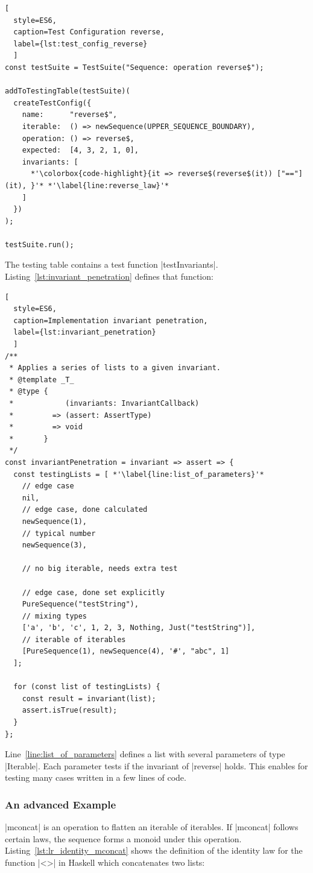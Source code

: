 \begin{lstlisting}[
  style=ES6, 
  caption=Test Configuration reverse,
  label={lst:test_config_reverse}
  ]
const testSuite = TestSuite("Sequence: operation reverse$");

addToTestingTable(testSuite)(
  createTestConfig({
    name:      "reverse$",
    iterable:  () => newSequence(UPPER_SEQUENCE_BOUNDARY),
    operation: () => reverse$,
    expected:  [4, 3, 2, 1, 0],
    invariants: [
      *'\colorbox{code-highlight}{it => reverse$(reverse$(it)) ["=="] (it), }'* *'\label{line:reverse_law}'*
    ]
  })
);

testSuite.run();
\end{lstlisting}
The testing table contains a test function |testInvariants|.
Listing~\ref{lst:invariant_penetration} defines that function:

\begin{lstlisting}[
  style=ES6, 
  caption=Implementation invariant penetration,
  label={lst:invariant_penetration}
  ]
/**
 * Applies a series of lists to a given invariant.
 * @template _T_
 * @type {
 *            (invariants: InvariantCallback)
 *         => (assert: AssertType)
 *         => void
 *       }
 */
const invariantPenetration = invariant => assert => {
  const testingLists = [ *'\label{line:list_of_parameters}'*
    // edge case
    nil,                                                   
    // edge case, done calculated
    newSequence(1),                                        
    // typical number
    newSequence(3),                                        

    // no big iterable, needs extra test

    // edge case, done set explicitly
    PureSequence("testString"),                            
    // mixing types
    ['a', 'b', 'c', 1, 2, 3, Nothing, Just("testString")], 
    // iterable of iterables
    [PureSequence(1), newSequence(4), '#', "abc", 1]       
  ];

  for (const list of testingLists) {
    const result = invariant(list);
    assert.isTrue(result);
  }
};
\end{lstlisting}

Line~\ref{line:list_of_parameters} defines a list with several parameters of
type |Iterable|. Each parameter tests if the invariant of |reverse| holds. 
This enables for testing many cases written in a few lines of code.

\subsubsection{An advanced Example}
\label{subsub:An advanced Example}
|mconcat| is an operation to flatten an iterable of iterables. If |mconcat|
follows certain laws, the sequence forms a monoid under this
operation.~\cite{haskell_monoid}
Listing~\ref{lst:lr_identity_mconcat} shows the definition of the identity law
for the function |<>| in Haskell which concatenates two lists:

